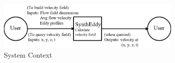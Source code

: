 \documentclass[12pt]{article}
\begin{document}

\begin{figure}[h!]
\begin{center}
 \includegraphics[width=0.8\textwidth]{SystemContextFigure-SynthEddy.png}
\caption{System Context}
\label{Fig_SystemContext} 
\end{center}
\end{figure}

\end{document}
